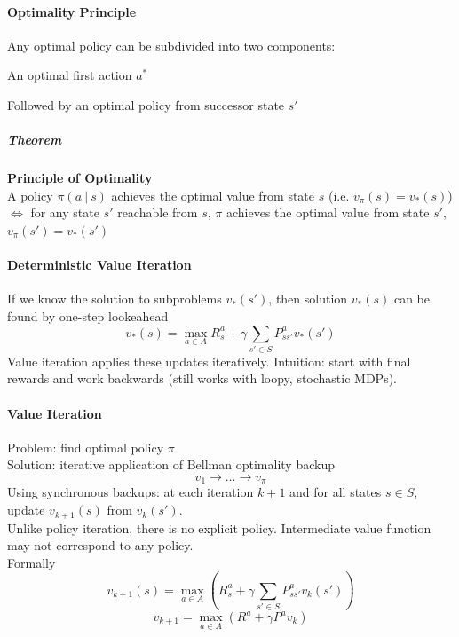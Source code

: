 \documentclass[10pt]{report}
\begin{document}
\paragraph{Optimality Principle} Any optimal policy can be subdivided into two components:
\begin{list}{}{}
	\item An optimal first action $a^*$
	\item Followed by an optimal policy from successor state $s'$
\end{list}
\subparagraph{Theorem} \textbf{Principle of Optimality}\\
A policy $\pi(a\:|\:s)$ achieves the optimal value from state $s$ (i.e. $v_\pi(s) = v_*(s)$) $\Leftrightarrow$ for any state $s'$ reachable from $s$, $\pi$ achieves the optimal value from state $s'$, $v_\pi(s') = v_*(s')$
\paragraph{Deterministic Value Iteration} If we know the solution to subproblems $v_*(s')$, then solution $v_*(s)$ can be found by one-step lookeahead
$$v_*(s) = \max_{a\in A} R_s^a + \gamma\sum_{s'\in S} P_{ss'}^av_*(s')$$
Value iteration applies these updates iteratively. Intuition: start with final rewards and work backwards (still works with loopy, stochastic MDPs).
\paragraph{Value Iteration} Problem: find optimal policy $\pi$\\
Solution: iterative application of Bellman optimality backup
$$v_1\rightarrow\ldots\rightarrow v_\pi$$
Using synchronous backups: at each iteration $k+1$ and for all states $s\in S$, update $v_{k+1}(s)$ from $v_k(s')$.\\
Unlike policy iteration, there is no explicit policy. Intermediate value function may not correspond to any policy.\\
Formally
$$v_{k+1}(s) = \max_{a\in A}\left(R_s^a + \gamma\sum_{s'\in S} P_{ss'}^a v_k(s')\right)$$
$$v_{k+1} = \max_{a\in A}(R^a + \gamma P^a v_k)$$
\end{document}
